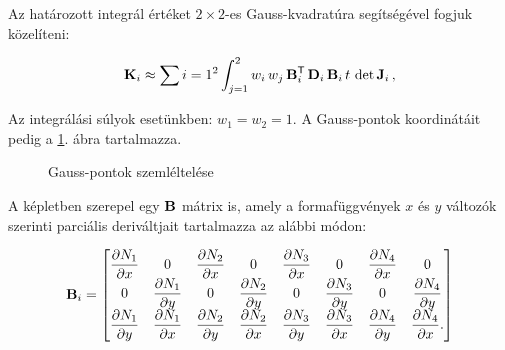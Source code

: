 Az határozott integrál értéket $2 \times 2$-es Gauss-kvadratúra segítségével
fogjuk közelíteni:
\begin{myframe}
  \begin{equation}
    \mathbf{K}_i \approx
    \sum{i=1}^{2} \int_{j=1}^{2}
    w_i \,
    w_j \,
    \mathbf{B}^{\mathsf T}_i \,
    \mathbf{D}_i \,
    \mathbf{B}_i \,
    t \,
    \det \mathbf{J}_i \,
    \text,
  \end{equation}
\end{myframe}

Az integrálási súlyok esetünkben: $w_1 = w_2 = 1$. A Gauss-pontok koordinátáit
pedig a \ref{fig:Gaussian}. ábra tartalmazza.
\begin{figure}[H]
  \centering
  \caption{Gauss-pontok szemléltelése}
  \label{fig:Gaussian}
\end{figure}

A képletben szerepel egy $\mathbf{B}$ mátrix is, amely a formafüggvények $x$ és $y$
változók szerinti parciális deriváltjait tartalmazza az alábbi módon:
\begin{myframe}
  \newcommand{\nd}[2]{\displaystyle\pdv{N_{#1}}{#2}}
  \def\arraystretch{2}
  \begin{equation}
    \rmat B_i = \begin{bmatrix}
      \nd{1}{x} & 0         &
      \nd{2}{x} & 0         &
      \nd{3}{x} & 0         &
      \nd{4}{x} & 0
      \\
      0         & \nd{1}{y} &
      0         & \nd{2}{y} &
      0         & \nd{3}{y} &
      0         & \nd{4}{y}
      \\
      \nd{1}{y} & \nd{1}{x} &
      \nd{2}{y} & \nd{2}{x} &
      \nd{3}{y} & \nd{3}{x} &
      \nd{4}{y} & \nd{4}{x}
      \text.
    \end{bmatrix}
  \end{equation}
\end{myframe}

